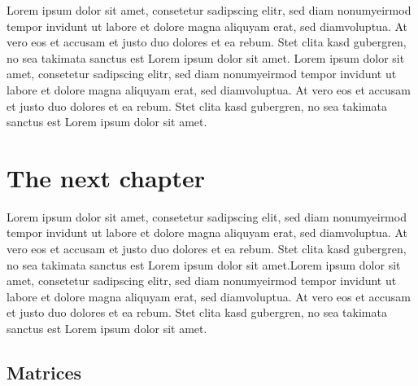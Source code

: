 \documentclass[a4paper,11pt,twoside]{report}
\theoremstyle{definition}
\begin{document}
Lorem ipsum dolor sit amet, consetetur sadipscing elitr, sed diam nonumyeirmod tempor invidunt ut labore et dolore magna aliquyam erat, sed diamvoluptua. At vero eos et accusam et justo duo dolores et ea rebum. Stet clita kasd gubergren, no sea takimata sanctus est Lorem ipsum dolor sit amet. Lorem ipsum dolor sit amet, consetetur sadipscing elitr, sed diam nonumyeirmod tempor invidunt ut labore et dolore magna aliquyam erat, sed diamvoluptua. At vero eos et accusam et justo duo dolores et ea rebum. Stet clita kasd gubergren, no sea takimata sanctus est Lorem ipsum dolor sit amet.



\chapter{The next chapter}

Lorem ipsum dolor sit amet, consetetur sadipscing elit, sed diam nonumyeirmod tempor invidunt ut labore et dolore magna aliquyam erat, sed diamvoluptua. At vero eos et accusam et justo duo dolores et ea rebum. Stet clita kasd gubergren, no sea takimata sanctus est Lorem ipsum dolor sit amet.Lorem ipsum dolor sit amet, consetetur sadipscing elitr, sed diam nonumyeirmod tempor invidunt ut labore et dolore magna aliquyam erat, sed diamvoluptua. At vero eos et accusam et justo duo dolores et ea rebum. Stet clita kasd gubergren, no sea takimata sanctus est Lorem ipsum dolor sit amet.


\section{Matrices}
\end{document}
